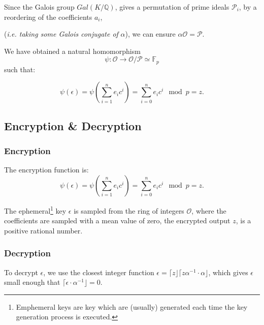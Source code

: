Since the Galois group $Gal(K/ \mathbb{Q})$, gives a permutation of prime ideals $\mathcal{P}_{i}$, by a reordering of the coefficients $a_{i}$, 

(\textit{i.e. taking some Galois conjugate of} $\mathit{\alpha}$), we can ensure $ \alpha \mathcal{O} = \mathcal{P}$. 
 
We have obtained a natural homomorphism  \[\psi : \mathcal{O} \rightarrow \mathcal{O}/ \mathcal{P} \simeq \mathbb{F}_{p}\] such that: 

\[ \psi(\epsilon) = \psi \left( \sum_{i=1}^{n}e_{i}c^{i} \right) = \sum_{i=0}^{n} e_{i}c^{i}\mod{p}=z. \]
  
  
  
\subsection{Encryption \& Decryption}

\subsubsection{Encryption}

The encryption function is:
\[\psi(\epsilon) = \psi \left( \sum_{i=1}^{n}e_{i}c^{i} \right) = \sum_{i=0}^{n} e_{i}c^{i}\mod{p}=z. \]

The ephemeral\footnote{Emphemeral keys are key which are (usually)  generated each time the key generation process is executed. } key $\epsilon$ is sampled from the ring of integers $\mathcal{O}$, where the coefficients are sampled with a mean value of zero, the encrypted output $z$, is a positive rational number.

\subsubsection{Decryption}

To decrypt $\epsilon$, we use the closest integer function $\epsilon = \lceil z \rfloor \lceil z\alpha^{-1} \cdot \alpha \rfloor$, which gives $\epsilon$ small enough that $\lceil \epsilon \cdot \alpha^{-1}\rfloor = 0$. 

